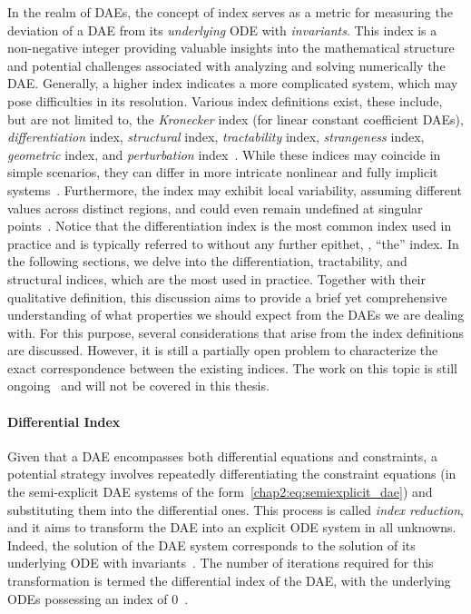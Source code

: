 In the realm of \acp{DAE}, the concept of index serves as a metric for measuring the deviation of a \ac{DAE} from its \emph{underlying} \ac{ODE} with \emph{invariants}. This index is a non-negative integer providing valuable insights into the mathematical structure and potential challenges associated with analyzing and solving numerically the \ac{DAE}. Generally, a higher index indicates a more complicated system, which may pose difficulties in its resolution. Various index definitions exist, these include, but are not limited to, the \emph{Kronecker} index (for linear constant coefficient \acp{DAE}), \emph{differentiation} index, \emph{structural} index, \emph{tractability} index, \emph{strangeness} index, \emph{geometric} index, and \emph{perturbation} index~\cite{mehrmann2015index}. While these indices may coincide in simple scenarios, they can differ in more intricate nonlinear and fully implicit systems~\cite{lamour2012detecting}. Furthermore, the index may exhibit local variability, assuming different values across distinct regions, and could even remain undefined at singular points~\cite{lamour2012detecting}. Notice that the differentiation index is the most common index used in practice and is typically referred to without any further epithet, \ie{}, ``the'' index. In the following sections, we delve into the differentiation, tractability, and structural indices, which are the most used in practice. Together with their qualitative definition, this discussion aims to provide a brief yet comprehensive understanding of what properties we should expect from the \acp{DAE} we are dealing with.
For this purpose, several considerations that arise from the index definitions are discussed. However, it is still a partially open problem to characterize the exact correspondence between the existing indices. The work on this topic is still ongoing~\cite{mehrmann2015index} and will not be covered in this thesis.

\paragraph{Differential Index}

Given that a \ac{DAE} encompasses both differential equations and constraints, a potential strategy involves repeatedly differentiating the constraint equations (in the semi-explicit \ac{DAE} systems of the form~\eqref{chap2:eq:semiexplicit_dae}) and substituting them into the differential ones. This process is called \emph{index reduction}, and it aims to transform the \ac{DAE} into an explicit \ac{ODE} system in all unknowns. Indeed, the solution of the \ac{DAE} system corresponds to the solution of its underlying \ac{ODE} with invariants~\cite{rheinboldt1984differential}. The number of iterations required for this transformation is termed the differential index of the \ac{DAE}, with the underlying \acp{ODE} possessing an index of 0~\cite{mehrmann2015index}.

